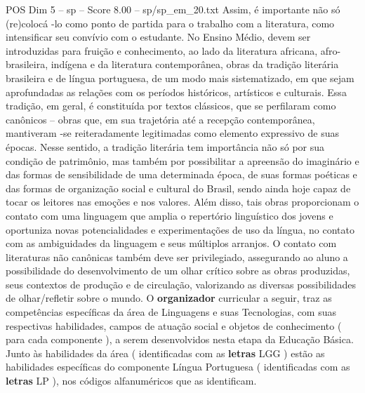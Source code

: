 \begin{textsample}{POS Dim 5 – sp – Score 8.00 – sp/sp\_em\_20.txt}
Assim, é importante não só (re)colocá -lo como ponto de partida para o trabalho com a literatura, como intensificar seu convívio com o estudante.
No Ensino Médio, devem ser introduzidas para fruição e conhecimento, ao lado da literatura africana, afro-brasileira, indígena e da literatura contemporânea, obras da tradição literária brasileira e de língua portuguesa, de um modo mais sistematizado, em que sejam aprofundadas as relações com os períodos históricos, artísticos e culturais.
Essa tradição, em geral, é constituída por textos clássicos, que se perfilaram como canônicos – obras que, em sua trajetória até a recepção contemporânea, mantiveram -se reiteradamente legitimadas como elemento expressivo de suas épocas.
Nesse sentido, a tradição literária tem importância não só por sua condição de patrimônio, mas também por possibilitar a apreensão do imaginário e das formas de sensibilidade de uma determinada época, de suas formas poéticas e das formas de organização social e cultural do Brasil, sendo ainda hoje capaz de tocar os leitores nas emoções e nos valores.
Além disso, tais obras proporcionam o contato com uma linguagem que amplia o repertório linguístico dos jovens e oportuniza novas potencialidades e experimentações de uso da língua, no contato com as ambiguidades da linguagem e seus múltiplos arranjos.
O contato com literaturas não canônicas também deve ser privilegiado, assegurando ao aluno a possibilidade do desenvolvimento de um olhar crítico sobre as obras produzidas, seus contextos de produção e de circulação, valorizando as diversas possibilidades de olhar/refletir sobre o mundo.
O \textbf{organizador} curricular a seguir, traz as competências específicas da área de Linguagens e suas Tecnologias, com suas respectivas habilidades, campos de atuação social e objetos de conhecimento ( para cada componente ), a serem desenvolvidos nesta etapa da Educação Básica.
Junto às habilidades da área ( identificadas com as \textbf{letras} LGG ) estão as habilidades específicas do componente Língua Portuguesa ( identificadas com as \textbf{letras} LP ), nos códigos alfanuméricos que as identificam.

\end{textsample}
